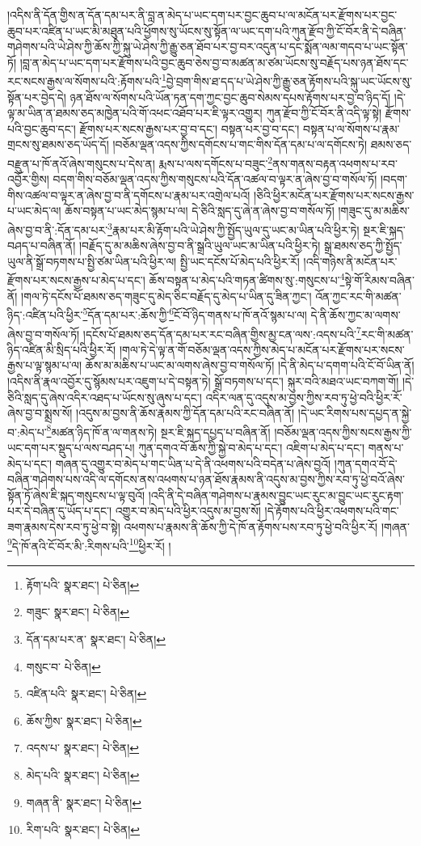 །འདིས་ནི་དོན་གྱིས་ན་དོན་དམ་པར་ནི་བླ་ན་མེད་པ་ཡང་དག་པར་བྱང་ཆུབ་པ་ལ་མངོན་པར་རྫོགས་པར་བྱང་ཆུབ་པར་འཛིན་པ་ཡང་མི་མཐུན་པའི་ཕྱོགས་སུ་ཡོངས་སུ་སྟོན་ལ་ཡང་དག་པའི་ཀུན་རྫོབ་ཀྱི་ངོ་བོར་ནི་དེ་བཞིན་གཤེགས་པའི་ཡེ་ཤེས་ཀྱི་ཆོས་ཀྱི་སྐུ་ཡེ་ཤེས་ཀྱི་རྒྱུ་ཅན་ཐོབ་པར་བྱ་བར་འདུན་པ་དང་སྨོན་ལམ་གདབ་པ་ཡང་སྟོན་ཏོ། །བླ་ན་མེད་པ་ཡང་དག་པར་རྫོགས་པའི་བྱང་ཆུབ་ཅེས་བྱ་བ་མཚན་མ་ཙམ་ཡོངས་སུ་བརྗོད་པས་ཉན་ཐོས་དང་རང་སངས་རྒྱས་ལ་སོགས་པའི་:རྟོགས་པའི་\footnote{རྟོག་པའི་  སྣར་ཐང་།  པེ་ཅིན། }བྱེ་བྲག་གིས་ཐ་དད་པ་ཡེ་ཤེས་ཀྱི་རྒྱུ་ཅན་རྟོགས་པའི་སྐུ་ཡང་ཡོངས་སུ་སྟོན་པར་བྱེད་དེ། ཉན་ཐོས་ལ་སོགས་པའི་ཡོན་ཏན་དག་ཀྱང་བྱང་ཆུབ་སེམས་དཔས་རྟོགས་པར་བྱ་བ་ཉིད་དོ། །དེ་ལྟ་མ་ཡིན་ན་ཐམས་ཅད་མཁྱེན་པའི་གོ་འཕང་འཐོབ་པར་ཇི་ལྟར་འགྱུར། ཀུན་རྫོབ་ཀྱི་ངོ་བོར་ནི་འདི་ལྟ་སྟེ། རྫོགས་པའི་བྱང་ཆུབ་དང་། རྫོགས་པར་སངས་རྒྱས་པར་བྱ་བ་དང་། བསྟན་པར་བྱ་བ་དང་། བསྟན་པ་ལ་སོགས་པ་རྣམ་གྲངས་སུ་ཐམས་ཅད་ཡོད་དོ། །བཅོམ་ལྡན་འདས་ཀྱིས་དགོངས་པ་གང་གིས་དོན་དམ་པ་ལ་དགོངས་ཏེ། ཐམས་ཅད་བརྫུན་པ་ཁོ་ནའོ་ཞེས་གསུངས་པ་དེས་ན། རྨས་པ་ལས་དགོངས་པ་བཟུང་\footnote{གཟུང་  སྣར་ཐང་།  པེ་ཅིན། }ནས་གནས་བརྟན་འཕགས་པ་རབ་འབྱོར་གྱིས། བདག་གིས་བཅོམ་ལྡན་འདས་ཀྱིས་གསུངས་པའི་དོན་འཚལ་བ་ལྟར་ན་ཞེས་བྱ་བ་གསོལ་ཏོ། །བདག་གིས་འཚལ་བ་ལྟར་ན་ཞེས་བྱ་བ་ནི་དགོངས་པ་རྣམ་པར་འགྲེལ་པའོ། །ཅིའི་ཕྱིར་མངོན་པར་རྫོགས་པར་སངས་རྒྱས་པ་ཡང་མེད་ལ། ཆོས་བསྟན་པ་ཡང་མེད་སྙམ་པ་ལ། དེ་ཅིའི་སླད་དུ་ཞེ་ན་ཞེས་བྱ་བ་གསོལ་ཏོ། །གཟུང་དུ་མ་མཆིས་ཞེས་བྱ་བ་ནི་:དོན་དམ་པར་\footnote{དོན་དམ་པར་ན་  སྣར་ཐང་།  པེ་ཅིན། }རྣམ་པར་མི་རྟོག་པའི་ཡེ་ཤེས་ཀྱི་སྤྱོད་ཡུལ་དུ་ཡང་མ་ཡིན་པའི་ཕྱིར་ཏེ། སྔར་ཇི་སྐད་བཤད་པ་བཞིན་ནོ། །བརྗོད་དུ་མ་མཆིས་ཞེས་བྱ་བ་ནི་སྒྲའི་ཡུལ་ཡང་མ་ཡིན་པའི་ཕྱིར་ཏེ། སྒྲ་ཐམས་ཅད་ཀྱི་སྤྱོད་ཡུལ་ནི་སྒྲོ་བཏགས་པ་སྤྱི་ཙམ་ཡིན་པའི་ཕྱིར་ལ། སྤྱི་ཡང་དངོས་པོ་མེད་པའི་ཕྱིར་རོ། །འདི་གཉིས་ནི་མངོན་པར་རྫོགས་པར་སངས་རྒྱས་པ་མེད་པ་དང་། ཆོས་བསྟན་པ་མེད་པའི་གཏན་ཚིགས་སུ་:གསུངས་པ་\footnote{གསུང་བ་  པེ་ཅིན། }སྟེ་གོ་རིམས་བཞིན་ནོ། །གལ་ཏེ་དངོས་པོ་ཐམས་ཅད་གཟུང་དུ་མེད་ཅིང་བརྗོད་དུ་མེད་པ་ཡིན་དུ་ཟིན་ཀྱང་། འོན་ཀྱང་རང་གི་མཚན་ཉིད་:འཛིན་པའི་ཕྱིར་\footnote{འཛིན་པའི་  སྣར་ཐང་།  པེ་ཅིན། }དོན་དམ་པར་:ཆོས་ཀྱི་\footnote{ཆོས་ཀྱིས་  སྣར་ཐང་།  པེ་ཅིན། }ངོ་བོ་ཉིད་གནས་པ་ཁོ་ནའོ་སྙམ་པ་ལ། དེ་ནི་ཆོས་ཀྱང་མ་ལགས་ཞེས་བྱ་བ་གསོལ་ཏོ། །དངོས་པོ་ཐམས་ཅད་དོན་དམ་པར་རང་བཞིན་གྱིས་མྱ་ངན་ལས་:འདས་པའི་\footnote{འདས་པ་  སྣར་ཐང་།  པེ་ཅིན། }རང་གི་མཚན་ཉིད་འཛིན་མི་སྲིད་པའི་ཕྱིར་རོ། །གལ་ཏེ་དེ་ལྟ་ན་གོ་བཅོམ་ལྡན་འདས་ཀྱིས་མེད་པ་མངོན་པར་རྫོགས་པར་སངས་རྒྱས་པ་ལྟ་སྙམ་པ་ལ། ཆོས་མ་མཆིས་པ་ཡང་མ་ལགས་ཞེས་བྱ་བ་གསོལ་ཏོ། །དེ་ནི་མེད་པ་དགག་པའི་ངོ་བོ་ཡིན་ནོ། །འདིས་ནི་རྣལ་འབྱོར་དུ་སྙོམས་པར་འཇུག་པ་དེ་བསྟན་ཏེ། སྒྲོ་བཏགས་པ་དང་། སྐུར་བའི་མཐའ་ཡང་བཀག་གོ། །དེ་ཅིའི་སླད་དུ་ཞེས་འདིར་འཐད་པ་ཡོངས་སུ་ཞུས་པ་དང་། འདིར་ལན་དུ་འདུས་མ་བྱས་ཀྱིས་རབ་ཏུ་ཕྱེ་བའི་ཕྱིར་རོ་ཞེས་བྱ་བ་སྨྲས་སོ། །འདུས་མ་བྱས་ནི་ཆོས་རྣམས་ཀྱི་དོན་དམ་པའི་རང་བཞིན་ནོ། །དེ་ཡང་རིགས་པས་དཔྱད་ན་སྐྱེ་བ་:མེད་པ་\footnote{མེད་པའི་  སྣར་ཐང་།  པེ་ཅིན། }མཚན་ཉིད་ཁོ་ན་ལ་གནས་ཏེ། སྔར་ཇི་སྐད་དཔྱད་པ་བཞིན་ནོ། །བཅོམ་ལྡན་འདས་ཀྱིས་སངས་རྒྱས་ཀྱི་ཡང་དག་པར་སྡུད་པ་ལས་བཤད་པ། ཀུན་དགའ་བོ་ཆོས་ཀྱི་སྐྱེ་བ་མེད་པ་དང་། འཇིག་པ་མེད་པ་དང་། གནས་པ་མེད་པ་དང་། གཞན་དུ་འགྱུར་བ་མེད་པ་གང་ཡིན་པ་དེ་ནི་འཕགས་པའི་བདེན་པ་ཞེས་བྱའོ། །ཀུན་དགའ་བོ་དེ་བཞིན་གཤེགས་པས་འདི་ལ་དགོངས་ནས་འཕགས་པ་ཉན་ཐོས་རྣམས་ནི་འདུས་མ་བྱས་ཀྱིས་རབ་ཏུ་ཕྱེ་བའོ་ཞེས་སྟོན་ཏོ་ཞེས་ཇི་སྐད་གསུངས་པ་ལྟ་བུའོ། །འདི་ནི་དེ་བཞིན་གཤེགས་པ་རྣམས་བྱུང་ཡང་རུང་མ་བྱུང་ཡང་རུང་རྟག་པར་དེ་བཞིན་དུ་ཡོད་པ་དང་། འགྱུར་བ་མེད་པའི་ཕྱིར་འདུས་མ་བྱས་སོ། །དེ་རྟོགས་པའི་ཕྱིར་འཕགས་པའི་གང་ཟག་རྣམས་དེས་རབ་ཏུ་ཕྱེ་བ་སྟེ། འཕགས་པ་རྣམས་ནི་ཆོས་ཀྱི་དེ་ཁོ་ན་རྟོགས་པས་རབ་ཏུ་ཕྱེ་བའི་ཕྱིར་རོ། །གཞན་\footnote{གཞན་ནི་  སྣར་ཐང་།  པེ་ཅིན། }དེ་ཁོ་ནའི་ངོ་བོར་མི་:རིགས་པའི་\footnote{རིག་པའི་  སྣར་ཐང་།  པེ་ཅིན། }ཕྱིར་རོ། །
